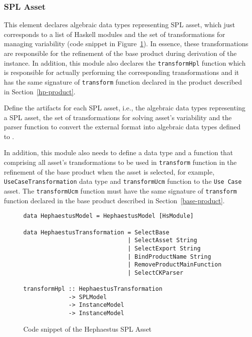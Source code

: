 
\subsubsection{\hp{} SPL Asset} 
\label{hp-spl-asset}

This element declares algebraic data types representing \hp{} SPL asset, which just corresponds to a list of Haskell modules and the set of transformations for managing \hpl{} variability (code snippet in Figure~\ref{fig:code-hp-spl-asset}). In essence, these transformations are responsible for the refinement of the base product during derivation of the \hpl{} instance. In addition, this module also declares the \texttt{transformHpl} function which is responsible for actually performing the corresponding \hpl{} transformations and it has the same signature of \texttt{transform} function declared in the \hp{} product described in Section~\ref{hp-product}.


\label{spl-assets}

Define the artifacts for each SPL asset, i.e., the algebraic data types representing a SPL asset, the set of transformations for solving asset's variability and the parser function to convert the external format into algebraic data types defined to \hpl.

In addition, this module also needs to define a data type and a function that comprising all asset's transformations to be used in \texttt{transform} function in the refinement of the base product when the asset is selected, for example, \texttt{UseCaseTransformation} data type and \texttt{transformUcm} function to the \texttt{Use Case} asset. The \texttt{transformUcm} function must have the same signature of \texttt{transform} function declared in the base product described in Section~\ref{base-product}.


\begin{figure}
\begin{lstlisting}
data HephaestusModel = HephaestusModel [HsModule]

data HephaestusTransformation = SelectBase
                              | SelectAsset String
                              | SelectExport String
                              | BindProductName String
                              | RemoveProductMainFunction
                              | SelectCKParser

transformHpl :: HephaestusTransformation
             -> SPLModel
             -> InstanceModel
             -> InstanceModel
\end{lstlisting}
\caption{Code snippet of the Hephaestus SPL Asset}
\label{fig:code-hp-spl-asset}
\end{figure}



